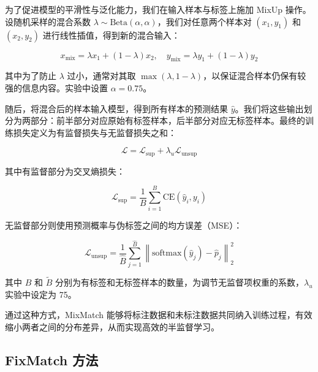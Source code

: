 \documentclass[a4paper, utf8]{ctexart}
\begin{document}
	为了促进模型的平滑性与泛化能力，我们在输入样本与标签上施加 MixUp 操作。设随机采样的混合系数 $\lambda\sim\text{Beta}(\alpha,\alpha)$，我们对任意两个样本对 $(x_1,y_1)$ 和 $(x_2,y_2)$ 进行线性插值，得到新的混合输入：
	
	\vspace{-.5em}
	\begin{equation}
		x_{\text{mix}}=\lambda x_1+(1-\lambda)x_2,\quad y_{\text{mix}}=\lambda y_1+(1-\lambda)y_2
	\end{equation}
	
	其中为了防止 $\lambda$ 过小，通常对其取 $\max(\lambda,1-\lambda)$，以保证混合样本仍保有较强的信息内容。实验中设置 $\alpha=0.75$。
	
	随后，将混合后的样本输入模型，得到所有样本的预测结果 $\hat{y}$。我们将这些输出划分为两部分：前半部分对应原始有标签样本，后半部分对应无标签样本。最终的训练损失定义为有监督损失与无监督损失之和：
	
	\vspace{-.5em}
	\begin{equation}
		\mathcal{L} = \mathcal{L}_{\text{sup}} + \lambda_u \mathcal{L}_{\text{unsup}}
	\end{equation}
	
	其中有监督部分为交叉熵损失：
	
	\vspace{-.5em}
	\begin{equation}
		\mathcal{L}_{\text{sup}}=\frac{1}{B}\sum^{B}_{i=1}\text{CE}(\hat{y}_i,y_i)
	\end{equation}
	
	无监督部分则使用预测概率与伪标签之间的均方误差（MSE）：
	
	\vspace{-.5em}
	\begin{equation}
		\mathcal{L}_{\text{unsup}}=\frac{1}{\hat{B}}\sum^{\hat{B}}_{j=1}\left\| \text{softmax}(\hat{y}_j) - \hat{p}_j \right\| ^2_2
	\end{equation}
	
	其中 $B$ 和 $\tilde{B}$ 分别为有标签和无标签样本的数量，为调节无监督项权重的系数，$\lambda_u$实验中设定为 75。
	
	通过这种方式，MixMatch 能够将标注数据和未标注数据共同纳入训练过程，有效缩小两者之间的分布差异，从而实现高效的半监督学习。
	
	\subsection{FixMatch 方法}
	
\end{document}
